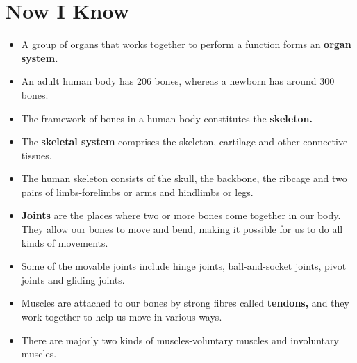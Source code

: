 \section{Now I Know}
\begin{itemize}
    \item A group of organs that works together to perform a function forms an \textbf{organ system.}
    \item An adult human body has 206 bones, whereas a newborn has around 300 bones.
    \item The framework of bones in a human body constitutes the \textbf{skeleton.}
    \item The \textbf{skeletal system} comprises the skeleton, cartilage and other connective tissues.
    \item The human skeleton consists of the skull, the backbone, the ribcage and two pairs of limbs-forelimbs or arms and hindlimbs or legs.
    \item \textbf{Joints} are the places where two or more bones come together in our body. They allow our bones to move and bend, making it possible for us to do all kinds of movements.
    \item Some of the movable joints include hinge joints, ball-and-socket joints, pivot joints and gliding joints.
    \item Muscles are attached to our bones by strong fibres called \textbf{tendons,} and they work together to help us move in various ways.
    \item There are majorly two kinds of muscles-voluntary muscles and involuntary muscles.
\end{itemize}